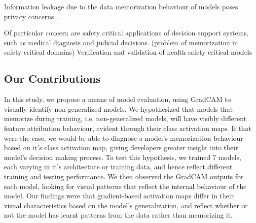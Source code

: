 \documentclass[conference]{IEEEtran}
\begin{document}
Information leakage due to the data memorization behaviour of models poses privacy concerns \cite{membershipinference}.

Of particular concern are safety critical applications of decision support systems, such as medical diagnosis and judicial decisions. (problem of memorization in safety critical domains)
Verification and validation of health safety critical models   




\subsection{Our Contributions}
In this study, we propose a means of model evaluation, using GradCAM to visually identify non-generalized models. We hypothesized that models that memorize during training, i.e. non-generalized models, will have visibly different feature attribution behaviour, evident through their class activation maps. If that were the case, we would be able to diagnose a model’s memorization behaviour based on it’s class activation map, giving developers greater insight into their model's decision making process. To test this hypothesis, we trained 7 models, each varying in it's architecture or training data, and hence reflect different training and testing performance. We then observed the GradCAM outputs for each model, looking for visual patterns that reflect the internal behaviour of the model. Our findings were that gradient-based activation maps differ in their visual characteristics based on the model's generalization, and reflect whether or not the model has learnt patterns from the data rather than memorizing it. 
\end{document}
